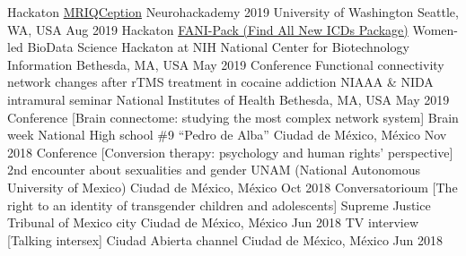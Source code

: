 \begin{cvproceedings}
    \cvproceeding
        {Hackaton}
        {\href{https://github.com/elizabethbeard/mriqception}{MRIQCeption}}
        {Neurohackademy 2019}
        {University of Washington}
        {Seattle, WA, USA}
        {Aug 2019}
    \cvproceeding
        {Hackaton}
        {\href{https://github.com/NCBI-Hackathons/Design-of-ICD-9-to-10-conversion-function-for-the-R-package-icd}{FANI-Pack (Find All New ICDs Package)}}
        {Women-led BioData Science Hackaton at NIH}
        {National Center for Biotechnology Information}
        {Bethesda, MA, USA}
        {May 2019}
    \cvproceeding
        {Conference}
        {Functional connectivity network changes after rTMS treatment in cocaine addiction}
        {NIAAA \& NIDA intramural seminar}
        {National Institutes of Health}
        {Bethesda, MA, USA}
        {May 2019}
    \cvproceeding
        {Conference}
        {[Brain connectome: studying the most complex network system]}
        {Brain week}
        {National High school \#9 ``Pedro de Alba''}
        {Ciudad de México, México}
        {Nov 2018}
    \cvproceeding
        {Conference}
        {[Conversion therapy: psychology and human rights' perspective]}
        {2nd encounter about sexualities and gender}
        {UNAM (National Autonomous University of Mexico)}
        {Ciudad de México, México}
        {Oct 2018}
    \cvproceeding
        {Conversatorioum}
        {[The right to an identity of transgender children and adolescents]}
        {}
        {Supreme Justice Tribunal of Mexico city}
        {Ciudad de México, México}
        {Jun 2018}
    \cvproceeding
        {TV interview}
        {[Talking intersex]}
        {}
        {Ciudad Abierta channel}
        {Ciudad de México, México}
        {Jun 2018}
\end{cvproceedings}
